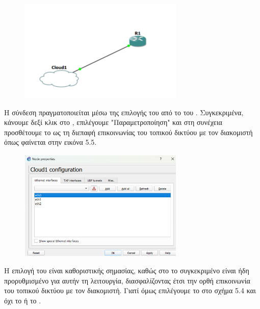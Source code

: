 \FloatBarrier

\begin{figure}[htb]
	\centering
	\includegraphics[width=0.7\textwidth]{graphics/CISCO_CLOUD.png}
	\caption{ }
\end{figure}

\FloatBarrier

Η σύνδεση πραγματοποιείται μέσω της επιλογής του  από το  του . Συγκεκριμένα, κάνουμε δεξί κλικ στο , επιλέγουμε "Παραμετροποίηση" και στη συνέχεια προσθέτουμε το  ως τη διεπαφή επικοινωνίας του τοπικού δικτύου με τον διακομιστή όπως φαίνεται στην εικόνα 5.5.

\FloatBarrier

\begin{figure}[htb]
	\centering
	\includegraphics[width=0.7\textwidth]{graphics/CLOUD_NODE_CONFIGURATION.png}
	\caption{ }
\end{figure}

\FloatBarrier


Η επιλογή του  είναι καθοριστικής σημασίας, καθώς στο  το συγκεκριμένο  είναι ήδη προρυθμισμένο για αυτήν τη λειτουργία, διασφαλίζοντας έτσι την ορθή επικοινωνία του τοπικού δικτύου με τον διακομιστή. Γιατί όμως επιλέγουμε το  στο σχήμα 5.4 και όχι το  ή το .

